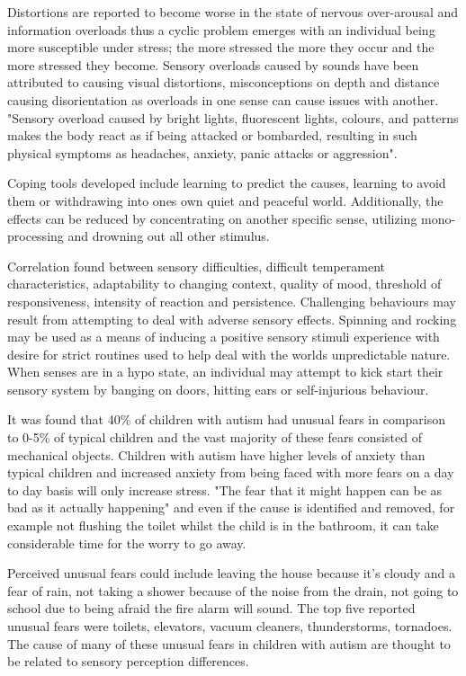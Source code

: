 Distortions are reported to become worse in the state of nervous over-arousal and information overloads\cite{olgab} thus a cyclic problem emerges with an individual being more susceptible under stress; the more stressed the more they occur and the more stressed they become. Sensory overloads caused by sounds have been attributed to causing visual distortions, misconceptions on depth and distance causing disorientation\cite{sensoryexperiences} as overloads in one sense can cause issues with another. "Sensory overload caused by bright lights, fluorescent lights, colours, and patterns makes the body react as if being attacked or bombarded, resulting in such physical symptoms as headaches, anxiety, panic attacks or aggression"\cite{bayes}. 

Coping tools developed include learning to predict the causes, learning to avoid them or withdrawing into ones own quiet and peaceful world. Additionally, the effects can be reduced by concentrating on another specific sense, utilizing mono-processing and drowning out all other stimulus. 

Correlation found between sensory difficulties, difficult temperament characteristics, adaptability to changing context, quality of mood, threshold of responsiveness, intensity of reaction and persistence\cite{temperament}. Challenging behaviours may result from attempting to deal with adverse sensory effects. Spinning and rocking may be used as a means of inducing a positive sensory stimuli experience with desire for strict routines used to help deal with the worlds unpredictable nature\cite{sensory_overview}. When senses are in a hypo state, an individual may attempt to kick start their sensory system by banging on doors, hitting ears or self-injurious behaviour\cite{sensory_overview}. 

It was found that 40\% of children with autism had unusual fears in comparison to 0-5\% of typical children and the vast majority of these fears consisted of mechanical objects. Children with autism have higher levels of anxiety than typical children\cite{fears} and increased anxiety from being faced with more fears on a day to day basis will only increase stress. "The fear that it might happen can be as bad as it actually happening"\cite{fears} and even if the cause is identified and removed, for example not flushing the toilet whilst the child is in the bathroom, it can take considerable time for the worry to go away.

Perceived unusual fears could include leaving the house because it's cloudy and a fear of rain, not taking a shower because of the noise from the drain, not going to school due to being afraid the fire alarm will sound. The top five reported unusual fears were toilets, elevators, vacuum cleaners, thunderstorms, tornadoes. The cause of many of these unusual fears in children with autism are thought to be related to sensory perception differences\cite{fears}.

